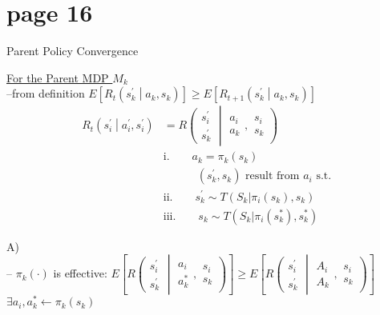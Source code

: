 \section*{page 16}

\begin{center}
Parent Policy Convergence
\end{center}

\underline{For the Parent MDP $M_k$}\\

--from definition $E\left[ R_t \left( s^\prime_k \middle| a_k, s_k \right) \right] \ge E\left[ R_{t+1}\left( s^\prime_k \middle| a_k, s_k  \right) \right]$\\
\begin{align*}
R_t\left( s^\prime_i \middle| a^\prime_i, s^\prime_i \right) & = R\left( \begin{array}{c} s^\prime_i \\ s^\prime_k \end{array} \middle| 
\begin{array}{c}a_i \\ a_k \end{array}, \begin{array}{c} s_i \\ s_k \end{array} \right)\\
& \text{i.}\qquad a_k = \pi_k( s_k )\\
& \qquad\quad ( s^\prime_k, s_k ) \text{\ result from\ }a_i\text{\ s.t.\ }\\
&\text{ii.}\qquad s^\prime_k \sim T( S_k | \pi_i( s_k ), s_k )\\
&\text{iii.}\qquad s_k \sim T( S_k | \pi_i( s^\ast_k ), s^\ast_k )
\end{align*}

A)\\
\boxed{$\textasteriskcentered$} -- $\pi_k(\cdot)$ is effective: $E\left[ R\left( \begin{array}{c} s^\prime_i \\ s^\prime_k \end{array} \middle| \begin{array}{c} a_i \\ a^\ast_k \end{array}, \begin{array}{c} s_i \\ s_k \end{array} \right) \right] 
\ge E\left[ R\left( \begin{array}{c} s^\prime_i \\ s^\prime_k \end{array} \middle| \begin{array}{c} A_i \\ A_k \end{array}, \begin{array}{c} s_i \\ s_k \end{array} \right) \right]$\\
\qquad\qquad$\exists a_i, a^\ast_k\leftarrow\pi_k(s_k)$\\

